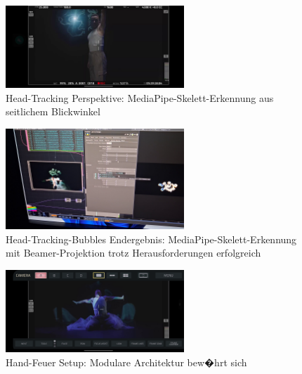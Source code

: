 \begin{figure}[!htbp]
   \centering
   \includegraphics[width=0.6\textwidth,height=0.25\textheight,keepaspectratio]{images/HeadTrackingLeftSideOfHeadWithHeadClearlyAttached.png}
   \caption{Head-Tracking Perspektive: MediaPipe-Skelett-Erkennung aus seitlichem Blickwinkel}
   \label{fig:low_light_tracking}
\end{figure}

\begin{figure}[!htbp]
   \centering
   \includegraphics[width=0.6\textwidth,height=0.25\textheight,keepaspectratio]{images/HeadtrackingBubblesClearlyAtHeadLevelOnBackgroundBeamerMediaPipeSkeletonBeautifullyVisible.png}
   \caption{Head-Tracking-Bubbles Endergebnis: MediaPipe-Skelett-Erkennung mit Beamer-Projektion trotz Herausforderungen erfolgreich}
   \label{fig:head_result}
\end{figure}

\begin{figure}[!htbp]
   \centering
   \includegraphics[width=0.6\textwidth,height=0.25\textheight,keepaspectratio]{images/HQCinemaCameraPerspectiveOfHandFireToTheSidesOfTheHands.png}
   \caption{Hand-Feuer Setup: Modulare Architektur bew�hrt sich}
   \label{fig:hand_fire_setup}
\end{figure}

